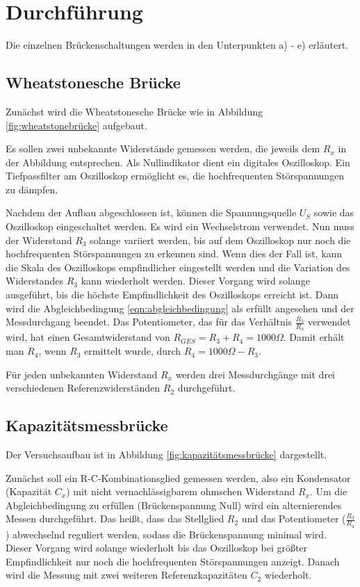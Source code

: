 \section{Durchführung}
\label{sec:Durchführung}

Die einzelnen Brückenschaltungen werden in den Unterpunkten a) - e) erläutert.

\subsection{Wheatstonesche Brücke}
\label{sec:durcha}
Zunächst wird die Wheatstonesche Brücke wie in Abbildung \ref{fig:wheatstonebrücke} aufgebaut.

Es sollen zwei unbekannte Widerstände gemessen werden, die jeweils dem $R_x$ in der Abbildung entsprechen.
Als Nullindikator dient ein digitales Oszilloskop.
Ein Tiefpassfilter am Oszilloskop ermöglicht es, die hochfrequenten Störspannungen zu dämpfen.

Nachdem der Aufbau abgeschlossen ist, können die Spannungsquelle $U_S$ sowie das Oszilloskop eingeschaltet werden.
Es wird ein Wechselstrom verwendet.
Nun muss der Widerstand $R_3$ solange variiert werden, bis auf dem Oszilloskop nur noch die hochfrequenten Störspannungen zu erkennen sind.
Wenn dies der Fall ist, kann die Skala des Oszilloskops empfindlicher eingestellt werden und
die Variation des Widerstandes $R_3$ kann wiederholt werden.
Dieser Vorgang wird solange ausgeführt, bis die höchste Empfindlichkeit des Oszilloskops erreicht ist.
Dann wird die Abgleichbedingung \eqref{eqn:abgleichbedingung} als erfüllt angesehen und der Messdurchgang beendet.
Das Potentiometer, das für das Verhältnis $\frac{R_3}{R_4}$ verwendet wird, hat einen Gesamtwiderstand von $R_{GES} = R_3 + R_4 = 1000 \Omega$.
Damit erhält man $R_4$, wenn $R_3$ ermittelt wurde, durch $R_4 = 1000 \Omega - R_3$.

Für jeden unbekannten Widerstand $R_x$ werden drei Messdurchgänge mit drei verschiedenen Referenzwiderständen $R_2$ durchgeführt.

\subsection{Kapazitätsmessbrücke}
\label{sec:durchb}
Der Versuchsaufbau ist in Abbildung \ref{fig:kapazitätsmessbrücke} dargestellt.

Zunächst soll ein R-C-Kombinationsglied gemessen werden, also ein Kondensator (Kapazität $C_x$) mit nicht vernachlässigbarem ohmschen Widerstand $R_x$.
Um die Abgleichbedingung zu erfüllen (Brückenspannung Null) wird ein alternierendes Messen durchgeführt. %
Das heißt, dass das Stellglied $R_2$ und das Potentiometer ($\frac{R_3}{R_4}$) abwechselnd reguliert werden, sodass die Brückenspannung minimal wird.
Dieser Vorgang wird solange wiederholt bis das Oszilloskop bei größter Empfindlichkeit nur noch die hochfrequenten Störspannungen anzeigt.
Danach wird die Messung mit zwei weiteren Referenzkapazitäten $C_2$ wiederholt.

